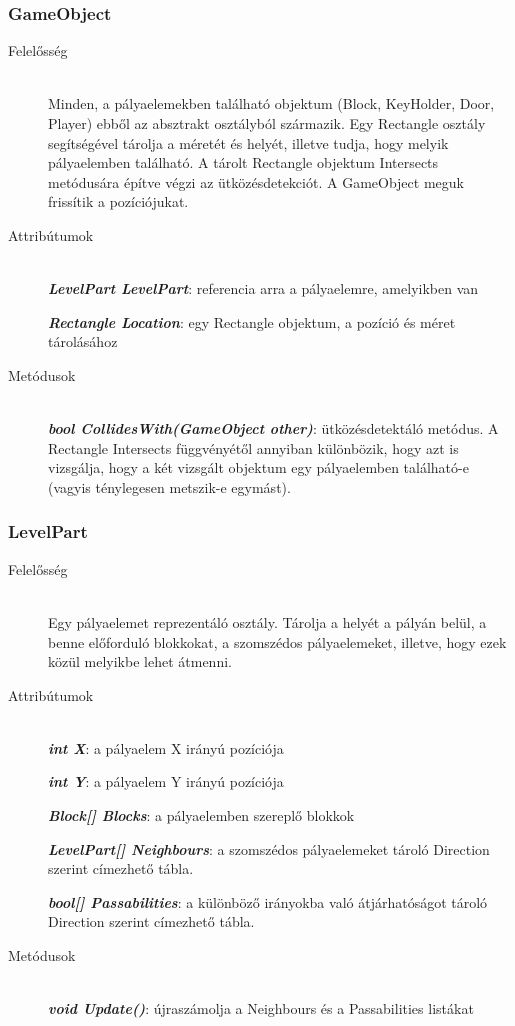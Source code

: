 \subsubsection{GameObject}
	\begin{description}
		\item[Felelősség] \hfill \\
		Minden, a pályaelemekben található objektum (Block, KeyHolder, Door, Player) ebből az absztrakt osztályból származik. Egy Rectangle osztály segítségével tárolja a méretét és helyét, illetve tudja, hogy melyik pályaelemben található. A tárolt Rectangle objektum Intersects metódusára építve végzi az ütközésdetekciót. A GameObject meguk frissítik a pozíciójukat.
		
		\item[Attribútumok]\hfill \\
		\textbf{\emph{LevelPart LevelPart}}: referencia arra a pályaelemre, amelyikben van
		
		\textbf{\emph{Rectangle Location}}: egy Rectangle objektum, a pozíció és méret tárolásához
		
		\item[Metódusok]\hfill \\
		\textbf{\emph{bool CollidesWith(GameObject other)}}: ütközésdetektáló metódus. A Rectangle Intersects függvényétől annyiban különbözik, hogy azt is vizsgálja, hogy a két vizsgált objektum egy pályaelemben található-e (vagyis ténylegesen metszik-e egymást).
						
	\end{description}

\subsubsection{LevelPart}
	\begin{description}
		\item[Felelősség] \hfill \\
		Egy pályaelemet reprezentáló osztály. Tárolja a helyét a pályán belül, a benne előforduló blokkokat, a szomszédos pályaelemeket, illetve, hogy ezek közül melyikbe lehet átmenni.

		\item[Attribútumok]\hfill \\		
		\textbf{\emph{int X}}: a pályaelem X irányú pozíciója
		
		\textbf{\emph{int Y}}: a pályaelem Y irányú pozíciója
		
		\textbf{\emph{Block[] Blocks}}: a pályaelemben szereplő blokkok
		
		\textbf{\emph{LevelPart[] Neighbours}}: a szomszédos pályaelemeket tároló Direction szerint címezhető tábla.
		
		\textbf{\emph{bool[] Passabilities}}: a különböző irányokba való átjárhatóságot tároló Direction szerint címezhető tábla.
		
		\item[Metódusok]\hfill \\
		\textbf{\emph{void Update()}}: újraszámolja a Neighbours és a Passabilities listákat
	\end{description}
	
